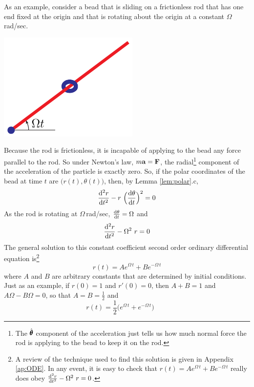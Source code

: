 \begin{eg}\label{eg:beadToss}
As an example, consider a bead that is sliding on a frictionless rod
that has one end fixed at the origin and that is rotating about the
origin at a constant $\Omega\,$rad/sec. 
\begin{efig}
\begin{center}
    \includegraphics{beadRod.pdf}
\end{center}
\end{efig}
Because the rod is frictionless, 
it is incapable of applying to the bead any force parallel to the rod. So 
under Newton's law, $m\mathbf{a}=\mathbf{F}$, the radial\footnote{The $\hat{{\pmb{\theta}}}$ component
of the acceleration just tells us how much normal force the rod is applying
to the bead to keep it on the rod.} component of the acceleration
of the particle is exactly zero. So, if the polar coordinates of the bead
at time $t$ are $\big(r(t),\theta(t)\big)$, then,
by Lemma \ref{lem:polar}.c,
\begin{equation*}
\difftwo{r}{t}-r\ \Big(\diff{\theta}{t}\Big)^2 = 0
\end{equation*}
As the rod is rotating at $\Omega\,$rad/sec,
$\diff{\theta}{t}=\Omega$ and
\begin{equation*}
\difftwo{r}{t}-\Omega^2\ r = 0
\end{equation*}
The general solution to this constant coefficient second order
ordinary differential equation is\footnote{A review of the technique used to find this solution is given in Appendix \ref{ap:ODE}. In any event, it is easy to check that $r(t)=A e^{\Omega\,t} + B e^{-\Omega\,t}$ really does obey
$\difftwo{r}{t}-\Omega^2\ r = 0$.} 
$$
r(t)  = A e^{\Omega\,t} + B e^{-\Omega\,t}
$$ 
where $A$ and $B$ are arbitrary constants that are determined by initial
conditions. 
Just as an example, if $r(0)= 1$ and $r'(0)= 0$,
then $A+B=1$ and $A\Omega-B\Omega=0$, so that $A=B=\frac{1}{2}$ and
\begin{equation*}
r(t)  = \frac{1}{2}\big(e^{\Omega\,t}+e^{-\Omega\,t}\big)\qquad

\end{equation*}
\end{eg}
